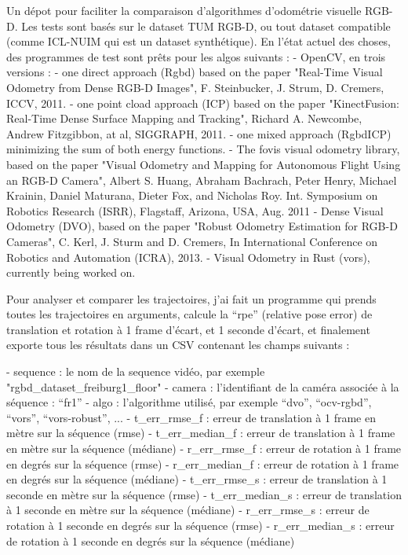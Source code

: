 Un dépot pour faciliter la comparaison d’algorithmes d’odométrie visuelle RGB-D. Les tests sont basés sur le dataset TUM RGB-D, ou tout dataset compatible (comme ICL-NUIM qui est un dataset synthétique). En l’état actuel des choses, des programmes de test sont prêts pour les algos suivants :
- OpenCV, en trois versions :
  - one direct approach (Rgbd) based on the paper "Real-Time Visual Odometry from Dense RGB-D Images", F. Steinbucker, J. Strum, D. Cremers, ICCV, 2011.
  - one point cload approach (ICP) based on the paper "KinectFusion: Real-Time Dense Surface Mapping and Tracking", Richard A. Newcombe, Andrew Fitzgibbon, at al, SIGGRAPH, 2011.
  - one mixed approach (RgbdICP) minimizing the sum of both energy functions.
- The fovis visual odometry library, based on the paper "Visual Odometry and Mapping for Autonomous Flight Using an RGB-D Camera", Albert S. Huang, Abraham Bachrach, Peter Henry, Michael Krainin, Daniel Maturana, Dieter Fox, and Nicholas Roy. Int. Symposium on Robotics Research (ISRR), Flagstaff, Arizona, USA, Aug. 2011
- Dense Visual Odometry (DVO), based on the paper "Robust Odometry Estimation for RGB-D Cameras", C. Kerl, J. Sturm and D. Cremers, In International Conference on Robotics and Automation (ICRA), 2013.
- Visual Odometry in Rust (vors), currently being worked on.

Pour analyser et comparer les trajectoires, j’ai fait un programme qui prends toutes les trajectoires en arguments, calcule la “rpe” (relative pose error) de translation et rotation à 1 frame d’écart, et 1 seconde d’écart, et finalement exporte tous les résultats dans un CSV contenant les champs suivants :

- sequence : le nom de la sequence vidéo, par exemple "rgbd\_dataset\_freiburg1\_floor"
- camera : l’identifiant de la caméra associée à la séquence : “fr1”
- algo : l’algorithme utilisé, par exemple “dvo”, “ocv-rgbd”, “vors”, “vors-robust”, ...
- t\_err\_rmse\_f : erreur de translation à 1 frame en mètre sur la séquence (rmse)
- t\_err\_median\_f : erreur de translation à 1 frame en mètre sur la séquence (médiane)
- r\_err\_rmse\_f : erreur de rotation à 1 frame en degrés sur la séquence (rmse)
- r\_err\_median\_f : erreur de rotation à 1 frame en degrés sur la séquence (médiane)
- t\_err\_rmse\_s : erreur de translation à 1 seconde en mètre sur la séquence (rmse)
- t\_err\_median\_s : erreur de translation à 1 seconde en mètre sur la séquence (médiane)
- r\_err\_rmse\_s : erreur de rotation à 1 seconde en degrés sur la séquence (rmse)
- r\_err\_median\_s : erreur de rotation à 1 seconde en degrés sur la séquence (médiane)

